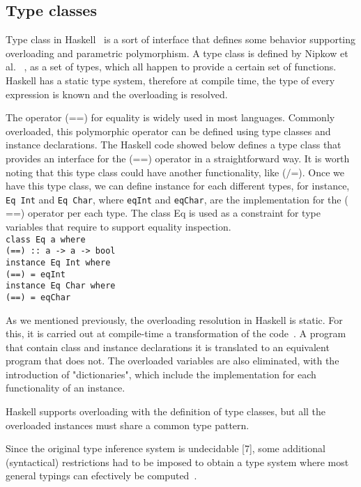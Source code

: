 \documentclass[hidelinks, twocolumn]{article}
\begin{document}
\subsection{Type classes}
Type class in Haskell~\cite{wadlerBlott:popl89} is a sort of interface that defines some behavior supporting overloading and parametric polymorphism. A type class is defined by Nipkow et al.~\cite{Nipkow1993}	, as a set of types, which all happen to provide a certain set of functions. Haskell has a static type system, therefore at compile time, the type of every expression is known and the overloading  is resolved. 

The operator ($\texttt{==}$) for equality is widely used in most languages. Commonly overloaded, this polymorphic operator can be defined using type classes and instance declarations. The Haskell code showed below defines a type class that provides an interface for the ($\texttt{==}$) operator in a straightforward way. It is worth noting that this type class could have another functionality, like ($\texttt{/=}$). Once we have this type class, we can define instance for each different types, for instance,  \texttt{Eq Int} and \texttt{Eq Char}, where \texttt{eqInt} and \texttt{eqChar}, are the implementation for the ($\texttt{==}$) operator per each type. The class Eq is used as a constraint for  type variables  that require to support equality inspection.\\

\texttt{class Eq a where\\
(==) :: a -> a -> bool\\
instance Eq Int where\\
(==) = eqInt\\
instance Eq Char where\\
(==) = eqChar \\}

As we mentioned previously, the overloading resolution in Haskell is static. For this, it is carried out 
at compile-time a transformation of the code~\cite{wadlerBlott:popl89}. A program that contain class and instance declarations it is translated to an equivalent program that does not. The overloaded variables are also eliminated, with the introduction of "dictionaries", which include the implementation for each functionality of an instance.   

Haskell supports overloading with the definition of type classes, but all the overloaded instances must share a common type pattern.

Since the original type inference system is undecidable [7], some additional (syntactical) restrictions had to be imposed to obtain a type system where most general typings can efectively be computed~\cite{SEIDL199457}.
\end{document}
